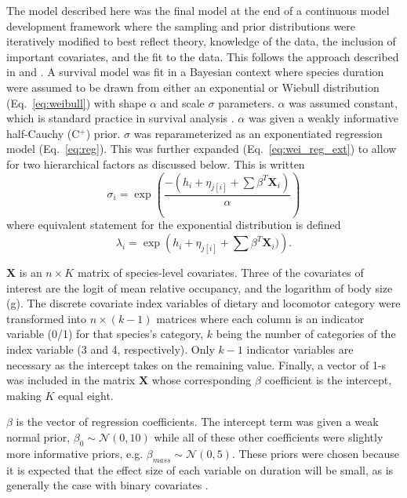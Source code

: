 \documentclass{article}
\begin{document}
The model described here was the final model at the end of a continuous model development framework where the sampling and prior distributions were iteratively modified to best reflect theory, knowledge of the data, the inclusion of important covariates, and the fit to the data. This follows the approach described in \cite{Gelman2007} and \cite{Gelman2013d}.
A survival model was fit in a Bayesian context where species duration were assumed to be drawn from either an exponential or Wiebull distribution (Eq.~\ref{eq:weibull}) with shape \(\alpha\) and scale \(\sigma\) parameters. \(\alpha\) was assumed constant, which is standard practice in survival analysis \cite{Klein2003}. \(\alpha\) was given a weakly informative half-Cauchy (C\(^{+}\)) prior. \(\sigma\) was reparameterized as an exponentiated regression model (Eq.~\ref{eq:reg}). This was further expanded (Eq.~\ref{eq:wei_reg_ext}) to allow for two hierarchical factors as discussed below. This is written
\begin{equation}
  \sigma_{i} = \exp\left(\frac{-(h_{i} + \eta_{j[i]} + \sum \beta^{T} \mathbf{X}_{i})}{\alpha}\right)
  \label{eq:wei_reg_ext}
\end{equation}
where equivalent statement for the exponential distribution is defined
\begin{equation}
  \lambda_{i} = \exp\left(h_{i} + \eta_{j[i]} + \sum \beta^{T} \mathbf{X}_{i})\right).
  \label{eq:exp_reg_ext}
\end{equation}

\(\mathbf{X}\) is an \(n \times K\) matrix of species-level covariates. Three of the covariates of interest are the logit of mean relative occupancy, and the logarithm of body size (g). The discrete covariate index variables of dietary and locomotor category were transformed into \(n \times (k - 1)\) matrices where each column is an indicator variable (0/1) for that species's category, \(k\) being the number of categories of the index variable (3 and 4, respectively). Only \(k - 1\) indicator variables are necessary as the intercept takes on the remaining value. Finally, a vector of 1-s was included in the matrix \(\mathbf{X}\) whose corresponding \(\beta\) coefficient is the intercept, making \(K\) equal eight.

\(\beta\) is the vector of regression coefficients. The intercept term was given a weak normal prior, \(\beta_{0} \sim \mathcal{N}(0, 10)\) while all of these other coefficients were slightly more informative priors, e.g. \(\beta_{mass} \sim \mathcal{N}(0, 5)\). These priors were chosen because it is expected that the effect size of each variable on duration will be small, as is generally the case with binary covariates \cite{Gelman2007}. %
\end{document}
